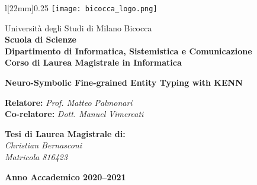 \begin{titlepage}
\begin{onehalfspace}
	\begin{wrapfigure}[4]{l}[22mm]{0.25\textwidth}
		\vspace*{-7mm}
		\centering
		\texttt{[image: bicocca\_logo.png]}
	\end{wrapfigure}
	\par
	\noindent Università degli Studi di Milano Bicocca \\
	\textbf{Scuola di Scienze \\
			Dipartimento di Informatica, Sistemistica e Comunicazione \\
			Corso di Laurea Magistrale in Informatica}
\end{onehalfspace}

\vfill
\par

\begin{doublespace}
\begin{center}
	{\Huge \textbf{Neuro-Symbolic Fine-grained Entity Typing with KENN}}
\end{center}
\end{doublespace}

\vfill
\par

\begin{onehalfspace}
\begin{flushleft}
	{\large \textbf{Relatore:} \textit{Prof. Matteo Palmonari} \\
			\textbf{Co-relatore:} \textit{Dott. Manuel Vimercati}}
\end{flushleft}

\vspace{8mm}
\par

\begin{flushright}
	{\large \textbf{Tesi di Laurea Magistrale di:} \\
			\textit{Christian Bernasconi} \\
			\textit{Matricola 816423}}
\end{flushright}
\end{onehalfspace}

\vfill
\par

\begin{center}
	{\large \textbf{Anno Accademico 2020--2021}}
\end{center}

\end{titlepage}
